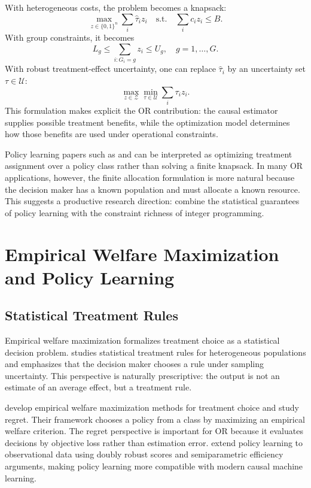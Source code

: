 \documentclass[11pt]{article}
\begin{document}
With heterogeneous costs, the problem becomes a knapsack:
\[
    \max_{z\in\{0,1\}^n}\sum_i \hat{\tau}_i z_i
    \quad
    \text{s.t.}\quad
    \sum_i c_i z_i\le B.
\]
With group constraints, it becomes
\[
    L_g \le \sum_{i:G_i=g}z_i \le U_g,\quad g=1,\ldots,G.
\]
With robust treatment-effect uncertainty, one can replace $\hat{\tau}_i$ by an uncertainty set $\tau\in\mathcal{U}$:
\[
    \max_{z\in\mathcal{Z}}\min_{\tau\in\mathcal{U}}\sum_i \tau_i z_i.
\]
This formulation makes explicit the OR contribution: the causal estimator supplies possible treatment benefits, while the optimization model determines how those benefits are used under operational constraints.

Policy learning papers such as \citet{kitagawa2018treated} and \citet{athey2021policy} can be interpreted as optimizing treatment assignment over a policy class rather than solving a finite knapsack. In many OR applications, however, the finite allocation formulation is more natural because the decision maker has a known population and must allocate a known resource. This suggests a productive research direction: combine the statistical guarantees of policy learning with the constraint richness of integer programming.

\section{Empirical Welfare Maximization and Policy Learning}
\label{sec:policy}

\subsection{Statistical Treatment Rules}

Empirical welfare maximization formalizes treatment choice as a statistical decision problem. \citet{manski2004statistical} studies statistical treatment rules for heterogeneous populations and emphasizes that the decision maker chooses a rule under sampling uncertainty. This perspective is naturally prescriptive: the output is not an estimate of an average effect, but a treatment rule.

\citet{kitagawa2018treated} develop empirical welfare maximization methods for treatment choice and study regret. Their framework chooses a policy from a class by maximizing an empirical welfare criterion. The regret perspective is important for OR because it evaluates decisions by objective loss rather than estimation error. \citet{athey2021policy} extend policy learning to observational data using doubly robust scores and semiparametric efficiency arguments, making policy learning more compatible with modern causal machine learning.
\end{document}
